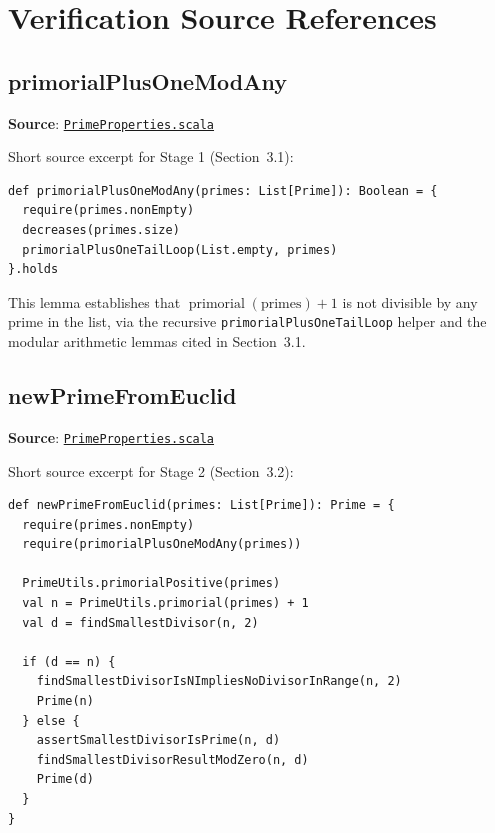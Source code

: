 \section{Verification Source References}
\label{sec:appendix-a}

\subsection{primorialPlusOneModAny}

\textbf{Source}:
\href{https://github.com/thiagomata/prime-numbers/blob/euclid-theorem-article-v1.0.0/src/main/scala/v1/chapter5/prime/properties/PrimeProperties.scala}{\texttt{PrimeProperties.scala}}

Short source excerpt for Stage 1 (Section~3.1):

\begin{lstlisting}[style=scala]
def primorialPlusOneModAny(primes: List[Prime]): Boolean = {
  require(primes.nonEmpty)
  decreases(primes.size)
  primorialPlusOneTailLoop(List.empty, primes)
}.holds
\end{lstlisting}

This lemma establishes that $\operatorname{primorial}(\text{primes}) + 1$
is not divisible by any prime in the list, via the recursive
\texttt{primorialPlusOneTailLoop} helper and the modular arithmetic
lemmas cited in Section~3.1.

\subsection{newPrimeFromEuclid}

\textbf{Source}:
\href{https://github.com/thiagomata/prime-numbers/blob/euclid-theorem-article-v1.0.0/src/main/scala/v1/chapter5/prime/properties/PrimeProperties.scala}{\texttt{PrimeProperties.scala}}

Short source excerpt for Stage 2 (Section~3.2):

\begin{lstlisting}[style=scala]
def newPrimeFromEuclid(primes: List[Prime]): Prime = {
  require(primes.nonEmpty)
  require(primorialPlusOneModAny(primes))

  PrimeUtils.primorialPositive(primes)
  val n = PrimeUtils.primorial(primes) + 1
  val d = findSmallestDivisor(n, 2)

  if (d == n) {
    findSmallestDivisorIsNImpliesNoDivisorInRange(n, 2)
    Prime(n)
  } else {
    assertSmallestDivisorIsPrime(n, d)
    findSmallestDivisorResultModZero(n, d)
    Prime(d)
  }
}
\end{lstlisting}

